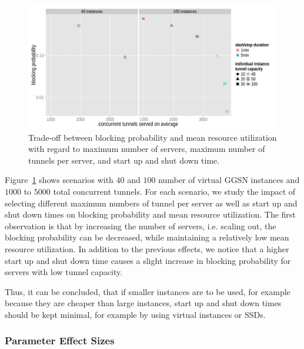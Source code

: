 \begin{figure}[htb]
  \centering
  \includegraphics[width=1.0\textwidth]{images/R-virtualized-startstop-tunnelusage-blocking-comparison.pdf}
  \caption{Trade-off between blocking probability and mean resource utilization with regard to maximum number of servers, maximum number of tunnels per server, and start up and shut down time.}
\label{c4:fig:compare_util_block}
\end{figure}



Figure~\ref{c4:fig:compare_util_block} shows scenarios with $40$ and $100$ number of virtual \gls{GGSN} instances and  $1000$ to $5000$ total concurrent tunnels. For each scenario, we study the impact of selecting different maximum numbers of tunnel per server as well as start up and shut down times on blocking probability and mean resource utilization. The first observation is that by increasing the number of servers, i.e. scaling out, the blocking probability can be decreased, while maintaining a relatively low mean resource utilization. In addition to the previous effects, we notice that a higher start up and shut down time causes a slight increase in blocking probability for servers with low tunnel capacity.



Thus, it can be concluded, that if smaller instances are to be used, for example because they are cheaper than large instances, start up and shut down times should be kept minimal, for example by using virtual instances or \glspl{SSD}.




\subsubsection{Parameter Effect Sizes}

